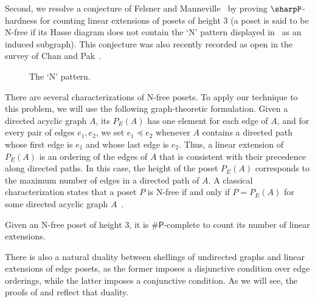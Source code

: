 \documentclass[11pt]{amsart}
\begin{document}
Second, we resolve a conjecture of Felsner and Manneville~\cite{FelsnerManneville} by proving $\sharpP$-hardness for counting linear extensions of  posets of height $3$ (a poset is said to be N-free if its Hasse diagram does not contain the `N' pattern displayed in~ as an induced subgraph). This conjecture was also recently recorded as open in the survey of Chan and Pak~\cite{LE_survery}. 
\begin{figure}
    \centering
{}
    \caption{The `N' pattern.}
    \label{fig:N-pattern}
\end{figure}

There are several characterizations of N-free posets.
To apply our technique to this problem, we will use the following graph-theoretic formulation. Given a directed acyclic graph $A$, its  $P_E(A)$ has one element for each edge of $A$, and for every pair of edges $e_1, e_2$, we set $e_1 \preceq e_2$ whenever $A$ contains a directed path whose first edge is $e_1$ and whose last edge is $e_2$. Thus, a linear extension of $P_E(A)$ is an ordering of the edges of $A$ that is consistent with their precedence along directed paths. In this case, the height of the poset $P_E(A)$ corresponds to the maximum number of edges in a directed path of $A$. A classical characterization states that a poset $P$ is N-free if and only if $P = P_E(A)$ for some directed acyclic graph $A$~\cite{FelsnerManneville}. 



\begin{thm}\label{thm:nfree}
Given an N-free poset of height $3$, it is $\#\mathsf{P}$-complete to count its number of linear extensions.
\end{thm}

There is also a natural duality between shellings of undirected graphs and linear extensions of edge posets, as the former imposes a disjunctive condition over edge orderings, while the latter imposes a conjunctive condition. As we will see, the proofs of  and  reflect that duality.
\end{document}
